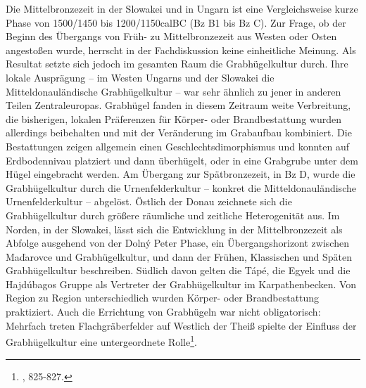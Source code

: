 \documentclass[openany,twoside,twocolumn]{book}
\let\rmarkdownfootnote\footnote%
\def\footnote{\protect\rmarkdownfootnote}
\begin{document}
Die Mittelbronzezeit in der Slowakei und in Ungarn ist eine
Vergleichsweise kurze Phase von 1500/1450 bis 1200/1150calBC (Bz B1 bis
Bz C). Zur Frage, ob der Beginn des Übergangs von Früh- zu
Mittelbronzezeit aus Westen oder Osten angestoßen wurde, herrscht in der
Fachdiskussion keine einheitliche Meinung. Als Resultat setzte sich
jedoch im gesamten Raum die Grabhügelkultur durch. Ihre lokale
Ausprägung -- im Westen Ungarns und der Slowakei die
Mitteldonauländische Grabhügelkultur -- war sehr ähnlich zu jener in
anderen Teilen Zentraleuropas. Grabhügel fanden in diesem Zeitraum weite
Verbreitung, die bisherigen, lokalen Präferenzen für Körper- oder
Brandbestattung wurden allerdings beibehalten und mit der Veränderung im
Grabaufbau kombiniert. Die Bestattungen zeigen allgemein einen
Geschlechtsdimorphismus und konnten auf Erdbodennivau platziert und dann
überhügelt, oder in eine Grabgrube unter dem Hügel eingebracht werden.
Am Übergang zur Spätbronzezeit, in Bz D, wurde die Grabhügelkultur durch
die Urnenfelderkultur -- konkret die Mitteldonauländische
Urnenfelderkultur -- abgelöst. Östlich der Donau zeichnete sich die
Grabhügelkultur durch größere räumliche und zeitliche Heterogenität aus.
Im Norden, in der Slowakei, lässt sich die Entwicklung in der
Mittelbronzezeit als Abfolge ausgehend von der Dolný Peter Phase, ein
Übergangshorizont zwischen Maďarovce und Grabhügelkultur, und dann der
Frühen, Klassischen und Späten Grabhügelkultur beschreiben. Südlich
davon gelten die Tápé, die Egyek und die Hajdúbagos Gruppe als Vertreter
der Grabhügelkultur im Karpathenbecken. Von Region zu Region
unterschiedlich wurden Körper- oder Brandbestattung praktiziert. Auch
die Errichtung von Grabhügeln war nicht obligatorisch: Mehrfach treten
Flachgräberfelder auf Westlich der Theiß spielte der Einfluss der
Grabhügelkultur eine untergeordnete Rolle\footnote{\textcite{markova_slovakia_2013},
  825-827.}.
\end{document}
